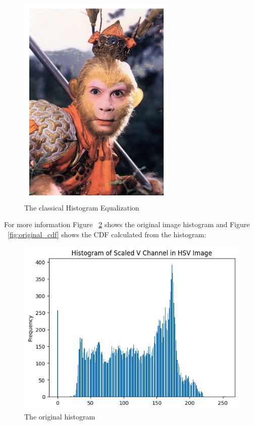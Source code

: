 \documentclass{article}
\begin{document}
	\begin{figure}
		\includegraphics[width=\linewidth]{img/HE.png}
		\caption{The classical Histogram Equalization}
		\label{fig:HE}
	\end{figure}
	
	For more information Figure ~\ref{fig:original_histo} shows the original image histogram and Figure ~\ref{fig:original_cdf} shows the CDF calculated from the histogram:
	
	\begin{figure}
		\includegraphics[width=\linewidth]{img/original_histo.png}
		\caption{The original histogram}
		\label{fig:original_histo}
	\end{figure}
	
\end{document}
